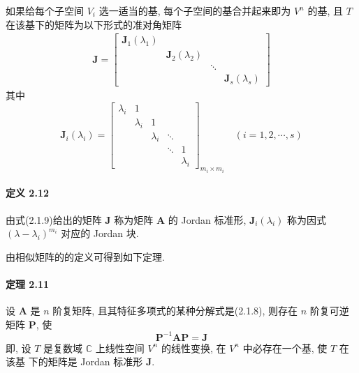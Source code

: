 \par 如果给每个子空间 $V_i$ 选一适当的基, 每个子空间的基合并起来即为 $V^n$ 的基, 且 $T$ 在该基下的矩阵为以下形式的准对角矩阵
\begin{gather}
    \bm{J} = \begin{bmatrix}
        \bm{J}_1(\lambda_1) &                     &        &                     \\
                            & \bm{J}_2(\lambda_2) &        &                     \\
                            &                     & \ddots &                     \\
                            &                     &        & \bm{J}_s(\lambda_s)
    \end{bmatrix}
    \tag{2.1.9}
\end{gather}
其中
$$
    \bm{J}_i(\lambda_i) = \begin{bmatrix}
        \lambda_i & 1         &           &        &           \\
                  & \lambda_i & 1         &        &           \\
                  &           & \lambda_i & \ddots &           \\
                  &           &           & \ddots & 1         \\
                  &           &           &        & \lambda_i
    \end{bmatrix}_{m_i\times m_i} \quad (i = 1, 2, \cdots, s)
$$

\paragraph*{定义 2.12} 由式(2.1.9)给出的矩阵 $\bm{J}$ 称为矩阵 $\bm{A}$ 的 Jordan 标准形, $\bm{J}_i(\lambda_i)$ 称为因式
$(\lambda - \lambda_i)^{m_i}$ 对应的 Jordan 块.

\par 由相似矩阵的的定义可得到如下定理.

\paragraph*{定理 2.11} 设 $\bm{A}$ 是 $n$ 阶复矩阵, 且其特征多项式的某种分解式是(2.1.8), 则存在 $n$ 阶复可逆矩阵 $\bm{P}$, 使
$$
    \bm{P}^{-1}\bm{AP} = \bm{J}
$$
即, 设 $T$ 是复数域 $\mathbb{C}$ 上线性空间 $V^n$ 的线性变换, 在 $V^n$ 中必存在一个基, 使 $T$ 在该基
下的矩阵是 Jordan 标准形 $\bm{J}$.

